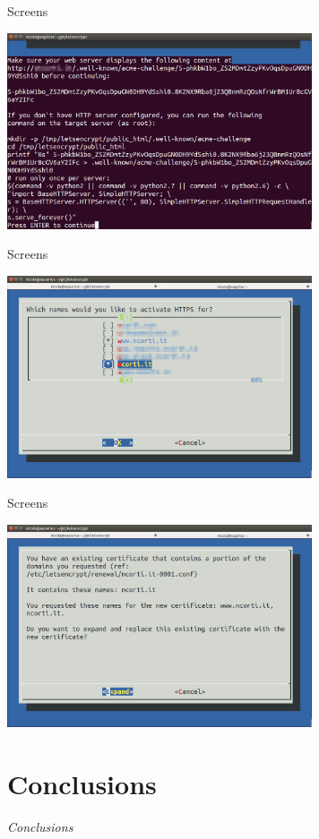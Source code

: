 \documentclass[xcolor=svgnames,11pt]{beamer}
\begin{document}
\begin{frame}{Screens}
\begin{center}
\includegraphics[width=9cm]{img/screen4.png}
\end{center}
\end{frame}
\begin{frame}{Screens}
\begin{center}
\includegraphics[width=9cm]{img/screen5.png}
\end{center}
\end{frame}
\begin{frame}{Screens}
\begin{center}
\includegraphics[width=9cm]{img/screen6.png}
\end{center}
\end{frame}


\section{Conclusions}
\begin{frame}{}
\begin{center}
\begin{Huge}
\textcolor{leorange}{\emph{Conclusions}}
\end{Huge}
\end{center}
\end{frame}
\end{document}
